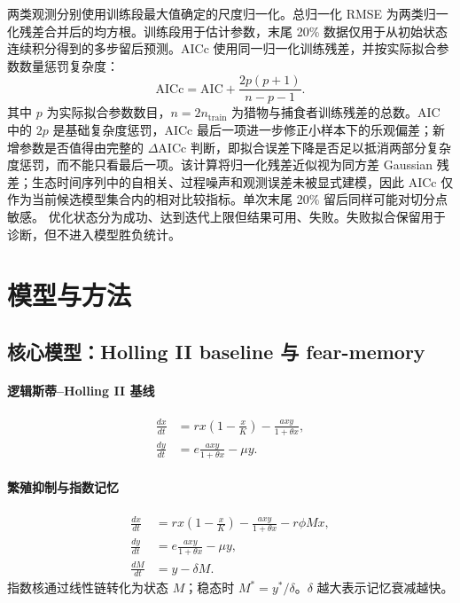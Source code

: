 \documentclass[12pt,a4paper]{ctexart}
\begin{document}
两类观测分别使用训练段最大值确定的尺度归一化。总归一化 RMSE 为两类归一化残差合并后的均方根。训练段用于估计参数，末尾 20\% 数据仅用于从初始状态连续积分得到的多步留后预测。AICc 使用同一归一化训练残差，并按实际拟合参数数量惩罚复杂度：
\[
 \mathrm{AICc}=\mathrm{AIC}+
 \frac{2p(p+1)}{n-p-1}.
\]
其中 $p$ 为实际拟合参数数目，$n=2n_{\mathrm{train}}$ 为猎物与捕食者训练残差的总数。AIC 中的 $2p$ 是基础复杂度惩罚，AICc 最后一项进一步修正小样本下的乐观偏差；新增参数是否值得由完整的 $\Delta\mathrm{AICc}$ 判断，即拟合误差下降是否足以抵消两部分复杂度惩罚，而不能只看最后一项。该计算将归一化残差近似视为同方差 Gaussian 残差；生态时间序列中的自相关、过程噪声和观测误差未被显式建模，因此 AICc 仅作为当前候选模型集合内的相对比较指标。单次末尾 20\% 留后同样可能对切分点敏感。
优化状态分为成功、达到迭代上限但结果可用、失败。失败拟合保留用于诊断，但不进入模型胜负统计。

\section{模型与方法}
\label{sec:model-method}

\subsection{核心模型：Holling II baseline 与 fear-memory}

\paragraph{逻辑斯蒂--Holling II 基线}
\begin{equation}
\begin{aligned}
 \frac{dx}{dt}&=rx\left(1-\frac{x}{K}\right)-\frac{axy}{1+\theta x},\\
 \frac{dy}{dt}&=e\frac{axy}{1+\theta x}-\mu y.
\end{aligned}
\label{eq:baseline}
\end{equation}

\paragraph{繁殖抑制与指数记忆}
\begin{equation}
\begin{aligned}
 \frac{dx}{dt}&=rx\left(1-\frac{x}{K}\right)-\frac{axy}{1+\theta x}-r\phi Mx,\\
 \frac{dy}{dt}&=e\frac{axy}{1+\theta x}-\mu y,\\
 \frac{dM}{dt}&=y-\delta M.
\end{aligned}
\label{eq:memory}
\end{equation}
指数核通过线性链转化为状态 $M$；稳态时 $M^*=y^*/\delta$。$\delta$ 越大表示记忆衰减越快。
\end{document}
